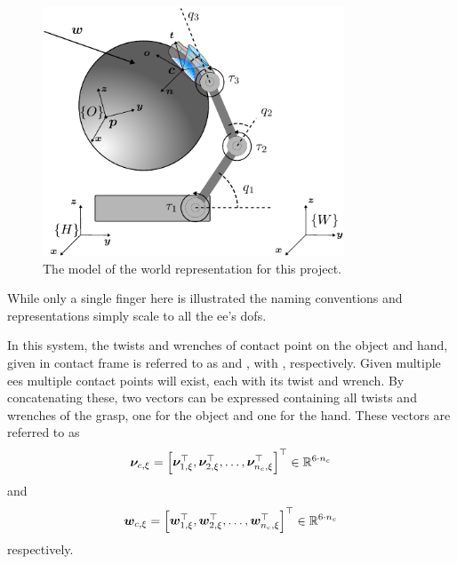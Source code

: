 \begin{figure}[h]
	\begin{small}
		\begin{center}
			\includegraphics[width=0.8\textwidth]{chapters/modeling/fig/test-hand-kinematics-crop.pdf}
		\end{center}
		\caption{The model of the world representation for this project.}
		\label{fig:full-system-model}
	\end{small}
\end{figure}


While only a single finger here is illustrated the naming conventions and representations simply scale to all the \gls{ee}'s \gls{dof}s.\medskip

In this system, the twists and wrenches of contact point  on the object and hand, given in contact frame  is referred to as  and , with , respectively. Given multiple \gls{ee}s multiple contact points will exist, each with its twist and wrench. By concatenating these, two vectors can be expressed containing all twists and wrenches of the grasp, one for the object and one for the hand. These vectors are referred to as 
%
\begin{equation}
	\vec{\nu}_{c,\xi} = \rvec{\vec{\nu}_{1,\xi}^\T, \vec{\nu}_{2,\xi}^\T, \ldots , \vec{\nu}_{n_c,\xi}^\T}^\T \inR{6\cdot n_c}
	\label{eq:all-twists}
\end{equation}
%
and
\begin{equation}
	\vec{w}_{c,\xi} = \rvec{\vec{w}_{1,\xi}^\T, \vec{w}_{2,\xi}^\T, \ldots , \vec{w}_{n_c,\xi}^\T}^\T \inR{6\cdot n_c}
	\label{eq:all-wrenches}
\end{equation}
%
respectively. \medskip

